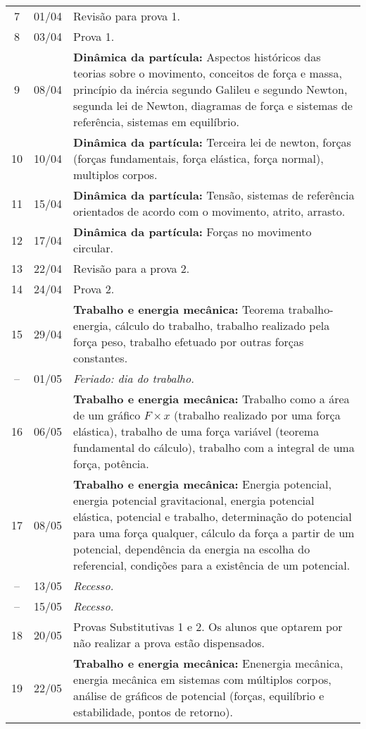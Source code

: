 \begin{center}
\begin{longtable}{ccp{70mm}}
  7 & 01/04 & Revisão para prova 1. \\
  8 & 03/04 & Prova 1. \\
  9 & 08/04 & \textbf{Dinâmica da partícula:} Aspectos históricos das teorias sobre o movimento, conceitos de força e massa, princípio da inércia segundo Galileu e segundo Newton, segunda lei de Newton, diagramas de força e sistemas de referência, sistemas em equilíbrio.\\
 10 & 10/04 & \textbf{Dinâmica da partícula:} Terceira lei de newton, forças (forças fundamentais, força elástica, força normal), multiplos corpos.\\
 11 & 15/04 & \textbf{Dinâmica da partícula:} Tensão, sistemas de referência orientados de acordo com o movimento, atrito, arrasto.\\
 12 & 17/04 & \textbf{Dinâmica da partícula:} Forças no movimento circular. \\
 13 & 22/04 & Revisão para a prova 2. \\
 14 & 24/04 & Prova 2. \\
 15 & 29/04 & \textbf{Trabalho e energia mecânica:} Teorema trabalho-energia, cálculo do trabalho, trabalho realizado pela força peso, trabalho efetuado por outras forças constantes.\\
 -- & 01/05 & \emph{Feriado: dia do trabalho.} \\
 16 & 06/05 & \textbf{Trabalho e energia mecânica:} Trabalho como a área de um gráfico $F \times x$ (trabalho realizado por uma força elástica), trabalho de uma força variável (teorema fundamental do cálculo), trabalho com a integral de uma força, potência. \\
 17 & 08/05 & \textbf{Trabalho e energia mecânica:} Energia potencial, energia potencial gravitacional, energia potencial elástica, potencial e trabalho, determinação do potencial para uma força qualquer, cálculo da força a partir de um potencial, dependência da energia na escolha do referencial, condições para a existência de um potencial. \\
 -- & 13/05 & \emph{Recesso.} \\
 -- & 15/05 & \emph{Recesso.} \\
 18 & 20/05 & Provas Substitutivas 1 e 2. Os alunos que optarem por não realizar a prova estão dispensados. \\
 19 & 22/05 & \textbf{Trabalho e energia mecânica:} Enenergia mecânica, energia mecânica em sistemas com múltiplos corpos, análise de gráficos de potencial (forças, equilíbrio e estabilidade, pontos de retorno).\\

\end{longtable}
\end{center}
